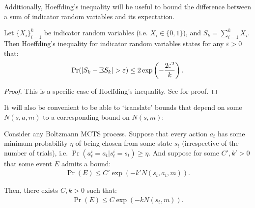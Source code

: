             Additionally, Hoeffding's inequality will be useful to bound the difference between a sum of indicator random variables and its expectation. 
            \begin{theorem} \label{thrm:hoeffding}
                Let $\{X_i\}_{i=1}^k$ be indicator random variables (i.e. $X_i\in\{0,1\}$), and $S_k=\sum_{i=1}^k X_i$. Then Hoeffding's inequality for indicator random variables states for any $\varepsilon > 0$ that:
                \begin{align}
                    \Pr(|S_k - \bb{E}S_k|>\varepsilon)\leq 2\exp\left(-\frac{2\varepsilon^2}{k}\right).
                \end{align}
            \end{theorem}
            \begin{proof}
                This is a specific case of Hoeffding's inequality. See  %
                for proof.
            \end{proof}











            It will also be convenient to be able to `translate' bounds that depend on some $N(s,a,m)$ to a corresponding bound on $N(s,m)$:
            \begin{lemma} \label{lem:sa_to_s}
                Consider any Boltzmann MCTS process. Suppose that every action $a_t$ has some minimum probability $\eta$ of being chosen from some state $s_t$ (irrespective of the number of trials), i.e. $\Pr(a^i_t=a_t|s^i_t=s_t)\geq\eta$. And suppose for some $C',k'>0$ that some event $E$ admits a bound:
                \begin{align}
                    \Pr(E) \leq C'\exp(-k'N(s_t,a_t,m)). \label{eq:sa_to_s_assume_bound}
                \end{align}
                
                Then, there exists $C,k>0$ such that:
                \begin{align}
                    \Pr(E) \leq C\exp(-k N(s_t,m)). 
                \end{align}
            \end{lemma}
            
